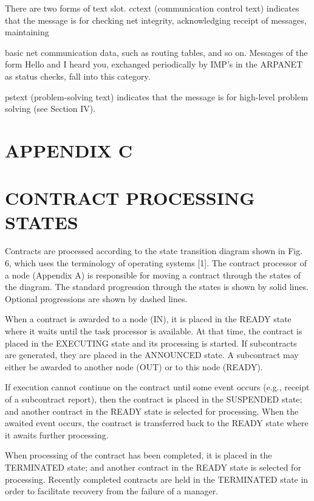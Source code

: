 \documentclass[
]{article}
\begin{document}
There are two forms of text slot. cctext (communication control text)
indicates that the message is for checking net integrity, acknowledging
receipt of messages, maintaining

basic net communication data, such as routing tables, and so on.
Messages of the form Hello and I heard you, exchanged periodically by
IMP's in the ARPANET as status checks, fall into this category.

pstext (problem-solving text) indicates that the message is for
high-level problem solving (see Section IV).

\section{APPENDIX C}\label{appendix-c}

\section{CONTRACT PROCESSING STATES}\label{contract-processing-states}

Contracts are processed according to the state transition diagram shown
in Fig. 6, which uses the terminology of operating systems {[}1{]}. The
contract processor of a node (Appendix A) is responsible for moving a
contract through the states of the diagram. The standard progression
through the states is shown by solid lines. Optional progressions are
shown by dashed lines.

When a contract is awarded to a node (IN), it is placed in the READY
state where it waits until the task processor is available. At that
time, the contract is placed in the EXECUTING state and its processing
is started. If subcontracts are generated, they are placed in the
ANNOUNCED state. A subcontract may either be awarded to another node
(OUT) or to this node (READY).

If execution cannot continue on the contract until some event occurs
(e.g., receipt of a subcontract report), then the contract is placed in
the SUSPENDED state; and another contract in the READY state is selected
for processing. When the awaited event occurs, the contract is
transferred back to the READY state where it awaits further processing.

When processing of the contract has been completed, it is placed in the
TERMINATED state; and another contract in the READY state is selected
for processing. Recently completed contracts are held in the TERMINATED
state in order to facilitate recovery from the failure of a manager.
\end{document}

